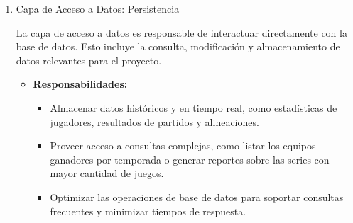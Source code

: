 \documentclass{report}
\begin{document}
\begin{enumerate}
        \begin{itemize}
            \item \textbf{Responsabilidades:}
            \begin{itemize}
                \item Cálculo de estadísticas avanzadas como promedios de bateo o efectividad de lanzadores.
                \item Validación de alineaciones en tiempo real para garantizar la coherencia de los equipos.
                \item Gestión de roles y permisos, asegurando que cada usuario acceda únicamente a sus funcionalidades 
                específicas.
                \item Coordinación de las solicitudes de reportes y actualización de datos en la base de datos.
            \end{itemize}
            \item \textbf{Importancia:} 
            Esta capa es el núcleo funcional del sistema, asegurando que las operaciones se realicen de manera 
            eficiente y coherente.
        \end{itemize}

        \item Capa de Acceso a Datos: Persistencia
        
        La capa de acceso a datos es responsable de interactuar directamente con la base de datos. Esto incluye la 
        consulta, modificación y almacenamiento de datos relevantes para el proyecto.
        
        \begin{itemize}
            \item \textbf{Responsabilidades:}
            \begin{itemize}
                \item Almacenar datos históricos y en tiempo real, como estadísticas de jugadores, resultados de 
                partidos y alineaciones.
                \item Proveer acceso a consultas complejas, como listar los equipos ganadores por temporada o generar 
                reportes sobre las series con mayor cantidad de juegos.
                \item Optimizar las operaciones de base de datos para soportar consultas frecuentes y minimizar 
                tiempos de respuesta.
            \end{itemize}
        \end{itemize}
    \end{enumerate}
\end{document}

